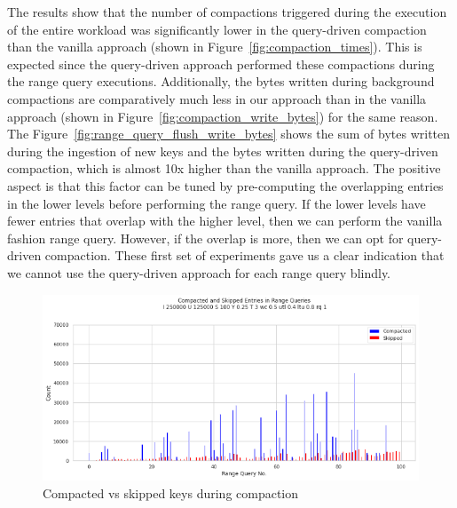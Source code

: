 The results show that the number of compactions triggered during the execution of the entire workload was significantly 
lower in the query-driven compaction than the vanilla approach (shown in Figure~\ref{fig:compaction_times}). This is 
expected since the query-driven approach performed these compactions during the range query executions. Additionally, 
the bytes written during background compactions are comparatively much less in our approach than in the vanilla approach
(shown in Figure~\ref{fig:compaction_write_bytes}) for the same reason. The Figure~\ref{fig:range_query_flush_write_bytes} 
shows the sum of bytes written during the ingestion of new keys and the bytes written during the query-driven compaction, 
which is almost 10x higher than the vanilla approach. The positive aspect is that this factor can be tuned by pre-computing 
the overlapping entries in the lower levels before performing the range query. If the lower levels have fewer entries 
that overlap with the higher level, then we can perform the vanilla fashion range query. However, if the overlap is more, 
then we can opt for query-driven compaction. These first set of experiments gave us a clear indication that we cannot 
use the query-driven approach for each range query blindly.


\begin{figure}
    \includegraphics[scale=0.75]{Figures/compacted_vs_skipped.png}
    \caption{Compacted vs skipped keys during compaction}\label{fig:compacted_vs_skipped}
\end{figure}

